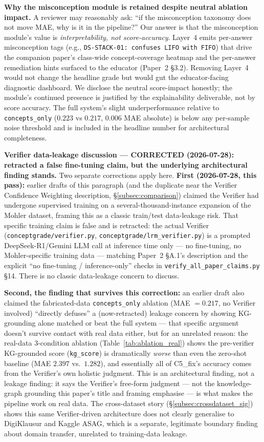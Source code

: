 \documentclass[conference]{IEEEtran}
\begin{document}
\textbf{Why the misconception module is retained despite neutral
ablation impact.} A reviewer may reasonably ask: ``if the misconception
taxonomy does not move MAE, why is it in the pipeline?'' Our answer is
that the misconception module's value is \emph{interpretability, not
score-accuracy}. Layer~4 emits per-answer misconception tags
(e.g., \texttt{DS-STACK-01: confuses LIFO with FIFO}) that drive the
companion paper's class-wide concept-coverage heatmap and the per-answer
remediation hints surfaced to the educator (Paper~2 §3.2). Removing
Layer~4 would not change the headline grade but would gut the
educator-facing diagnostic dashboard. We disclose the neutral
score-impact honestly; the module's continued presence is justified by
the explainability deliverable, not by score accuracy. The full system's slight
underperformance relative to \texttt{concepts\_only} ($0.223$ vs $0.217$,
$0.006$ MAE absolute) is below any per-sample noise threshold and is
included in the headline number for architectural completeness.

\textbf{Verifier data-leakage discussion --- CORRECTED (2026-07-28):
retracted a false fine-tuning claim, but the underlying architectural
finding stands.} Two separate corrections apply here. \textbf{First
(2026-07-28, this pass):} earlier drafts of this paragraph (and the
duplicate near the Verifier Confidence Weighting description,
\S\ref{subsec:comparison}) claimed the Verifier had undergone supervised
training on a several-thousand-instance expansion of the Mohler dataset,
framing this as a classic train/test data-leakage risk. That specific
training claim is false and is retracted: the actual Verifier
(\texttt{conceptgrade/verifier.py}, \texttt{conceptgrade/lrm\_verifier.py})
is a prompted DeepSeek-R1/Gemini LLM call at inference time only --- no
fine-tuning, no Mohler-specific training data --- matching Paper~2
§A.1's description and the explicit ``no fine-tuning / inference-only''
checks in \texttt{verify\_all\_paper\_claims.py} §14. There is no
classic data-leakage concern to discuss.

\textbf{Second, the finding that survives this correction:} an earlier
draft also claimed the fabricated-data \texttt{concepts\_only} ablation
(MAE $=0.217$, no Verifier involved) ``directly defuses'' a (now-retracted)
leakage concern by showing KG-grounding alone matched or beat the full
system --- that specific argument doesn't survive contact with real data
either, but for an unrelated reason: the real-data 3-condition ablation
(Table~\ref{tab:ablation_real}) shows the pre-verifier KG-grounded score
(\texttt{kg\_score}) is dramatically \emph{worse} than even the
zero-shot baseline (MAE $2.397$ vs.\ $1.282$), and essentially all of
C5\_fix's accuracy comes from the Verifier's own holistic judgment. This
is an architectural finding, not a leakage finding: it says the
Verifier's free-form judgment --- not the knowledge-graph grounding this
paper's title and framing emphasise --- is what makes the pipeline work
on real data. The cross-dataset story (\S\ref{subsec:crossdataset_sig})
shows this same Verifier-driven architecture does not clearly generalise
to DigiKlausur and Kaggle ASAG, which is a separate, legitimate boundary
finding about domain transfer, unrelated to training-data leakage.
\end{document}
